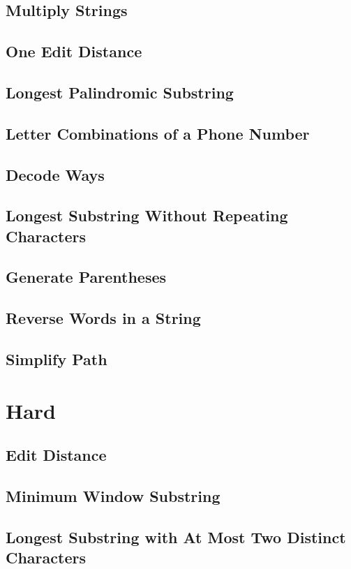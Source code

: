 \documentclass[12pt]{book}
\begin{document}
\subsection{Multiply Strings}
\label{sec-2-2-4}
\subsection{One Edit Distance}
\label{sec-2-2-5}
\subsection{Longest Palindromic Substring}
\label{sec-2-2-6}
\subsection{Letter Combinations of a Phone Number}
\label{sec-2-2-7}
\subsection{Decode Ways}
\label{sec-2-2-8}
\subsection{Longest Substring Without Repeating Characters}
\label{sec-2-2-9}
\subsection{Generate Parentheses}
\label{sec-2-2-10}
\subsection{Reverse Words in a String}
\label{sec-2-2-11}
\subsection{Simplify Path}
\label{sec-2-2-12}
\section{Hard}
\label{sec-2-3}
\subsection{Edit Distance}
\label{sec-2-3-1}
\subsection{Minimum Window Substring}
\label{sec-2-3-2}
\subsection{Longest Substring with At Most Two Distinct Characters}
\label{sec-2-3-3}
\end{document}
